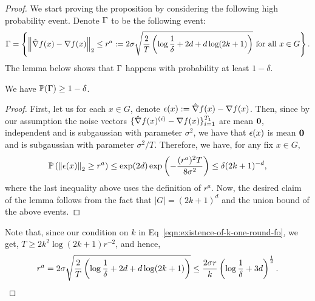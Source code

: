 \begin{proof}
%
We start proving the proposition by considering the following high probability event. 
Denote $\event$ to be the following event: 
\begin{equation*}
\event = \left\{\norm{\hat{\grad} f(x) - \grad f(x)}_2 \leq r^a \defeq 
	2\sigma\sqrt{\frac{2}{T}\left(\log \frac{1}{\delta} + 2d + d\log(2k+1) \right)}
		~\text{for all $x \in G$}\right\}.
\end{equation*} 
The lemma below shows that $\event$ happens with probability at least $1-\delta$.
\begin{lemma}
\label{lemma:high-prob-zo-one-round}
We have $\P(\Gamma) \geq 1-\delta$. 
\end{lemma}
\begin{proof}
First, let us for each $x\in G$, denote $\noise(x) \defeq \hat{\grad} f(x) - \grad f(x)$. 
Then, since by our assumption the noise vectors $\{\hat{\grad} f(x)^{(i)} - \grad f(x)\}_{i=1}^{T_1}$ 
are mean $\zeros$, independent and is subgaussian with parameter $\sigma^2$, 
we have that $\noise(x)$ is mean $\zeros$ and is subgaussian with parameter $\sigma^2/T$. 
Therefore, we have, for any fix $x\in G$, 
\begin{align*}
\P\left(\norm{\noise(x)}_2 \geq r^a \right) 
	\leq \exp(2d)\exp\left(-\frac{(r^a)^2 T}{8\sigma^2}\right) \leq \delta (2k+1)^{-d}, 
\end{align*}
where the last inequality above uses the definition of $r^a$. 
Now, the desired claim of the lemma follows from the fact that 
$|G| = (2k+1)^d$ and the union bound of the above events. 
\end{proof}
Note that, since our condition on $k$ in Eq~\eqref{eqn:existence-of-k-one-round-fo}, 
we get, $T \geq 2k^2 \log(2k+1) r^{-2}$, and hence, 
\begin{equation}
\label{eqn:r-a-upper-bound-fo-one-round}
r^a = 2\sigma\sqrt{\frac{2}{T}\left(\log \frac{1}{\delta} + 2d + d\log(2k+1) \right)} 
	\leq \frac{2\sigma r}{k} \left( \log \frac{1}{\delta} + 3d\right)^\half. 
\end{equation}



\end{proof}
